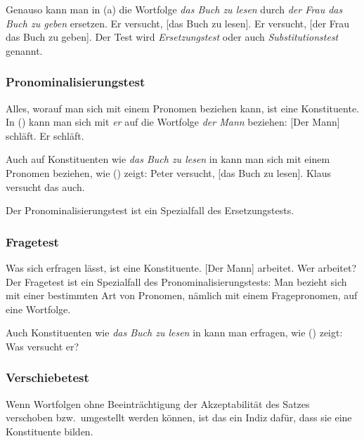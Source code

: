 \documentclass[ number=45
			   ,series=eotms
			   ,printondemand
			  ]{langsci}
\begin{document}
{\noindent
Genauso kann man in (a) die Wortfolge \emph{das Buch zu lesen} durch
\emph{der Frau das Buch zu geben} ersetzen.
\eal
\ex Er versucht, [das Buch zu lesen].\label{ex-das-buch-zu-lesen}
\ex Er versucht, [der Frau das Buch zu geben].
\zl
%
Der Test wird \emph{Ersetzungstest} oder auch \emph{Substitutionstest} genannt.

\subsubsection{Pronominalisierungstest}

Alles,
worauf man sich mit einem Pronomen beziehen kann, ist eine Konstituente. 
In () kann man sich \zb mit \emph{er} auf die Wortfolge \emph{der Mann} beziehen:
\eal
\ex {}[Der Mann] schläft.
\ex Er schläft.
\zl

\noindent
Auch auf Konstituenten wie \emph{das Buch zu lesen} in 
kann man sich mit einem Pronomen beziehen, wie () zeigt:
\eal
\ex Peter versucht, [das Buch zu lesen].
\ex Klaus versucht das auch.
\zl

\noindent
Der Pronominalisierungstest ist ein Spezialfall des Ersetzungstests.

\subsubsection{Fragetest}

Was sich erfragen lässt, ist eine Konstituente.
        \eal
        \ex {}[Der Mann] arbeitet.
        \ex Wer arbeitet?
        \zl
Der Fragetest ist ein Spezialfall des Pronominalisierungstests: Man bezieht sich mit einer
bestimmten Art von Pronomen, nämlich mit einem Fragepronomen, auf eine Wortfolge.

Auch Konstituenten wie \emph{das Buch zu lesen} in  kann man erfragen,
wie () zeigt:
\ea
Was versucht er?
\z

\subsubsection{Verschiebetest}

Wenn Wortfolgen ohne Beeinträchtigung der Akzeptabilität des Satzes verschoben
bzw.\ umgestellt werden können, ist das ein Indiz dafür, dass sie eine Konstituente bilden.

}
\end{document}
